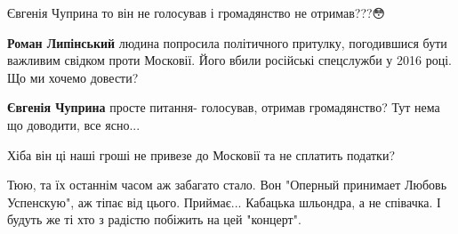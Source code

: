 \begin{itemize}
\begin{itemize}
 
Євгенія Чуприна то він не голосував і громадянство не отримав???😳

 
\textbf{Роман Липінський} людина попросила політичного притулку, погодившися бути важливим свідком проти Московії. Його вбили російські спецслужби у 2016 році. Що ми хочемо довести?

 
\textbf{Євгенія Чуприна} просте питання- голосував, отримав громадянство?
Тут нема що доводити, все ясно...
\end{itemize}

 
Хіба він ці наші гроші не привезе до Московії та не сплатить податки?

 

Тюю, та їх останнім часом аж забагато стало. Вон "Оперный принимает Любовь
Успенскую", аж тіпає від цього. Приймає... Кабацька шльондра, а не співачка. І
будуть же ті хто з радістю побіжить на цей "концерт".


 

\end{itemize}
